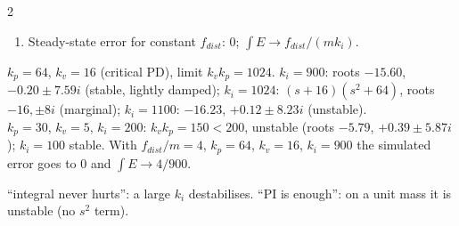 \begin{multicols}{2}
\begin{recipe}
\begin{enumerate}
\item Steady-state error for constant $f_{dist}$: $0$; $\int E\to f_{dist}/(mk_i)$.
\end{enumerate}
\end{recipe}
\begin{worked}
$k_p=64$, $k_v=16$ (critical PD), limit $k_vk_p=1024$. $k_i=900$: roots $-15.60$, $-0.20\pm7.59i$ (stable, lightly damped); $k_i=1024$: $(s+16)(s^2+64)$, roots $-16,\pm8i$ (marginal); $k_i=1100$: $-16.23$, $+0.12\pm8.23i$ (unstable).\\
$k_p=30$, $k_v=5$, $k_i=200$: $k_vk_p=150<200$, unstable (roots $-5.79$, $+0.39\pm5.87i$); $k_i=100$ stable. With $f_{dist}/m=4$, $k_p=64$, $k_v=16$, $k_i=900$ the simulated error goes to $0$ and $\int E\to4/900$.
\end{worked}
\begin{trap}
``integral never hurts'': a large $k_i$ destabilises. ``PI is enough'': on a unit mass it is unstable (no $s^2$ term).
\end{trap}


\end{multicols}
